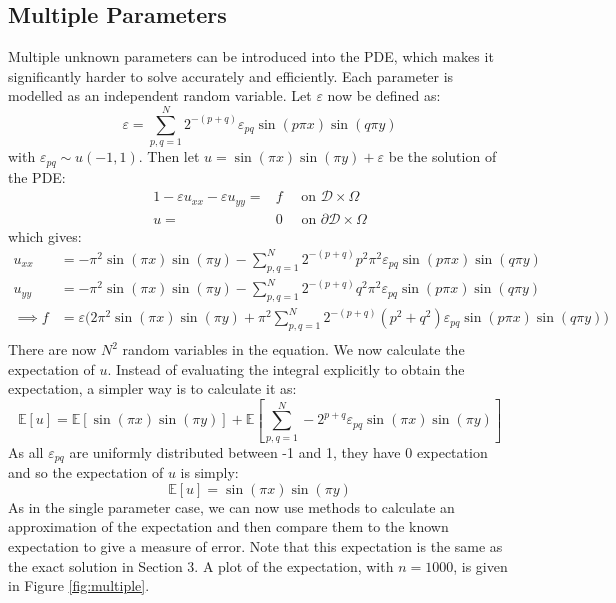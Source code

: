 \documentclass[11pt]{article}
\numberwithin{equation}{section}
\begin{document}
\subsection{Multiple Parameters}
Multiple unknown parameters can be introduced into the PDE, which makes it significantly harder to solve accurately and efficiently. Each parameter is modelled as an independent random variable. Let $\varepsilon$ now be defined as:
\begin{equation}
\varepsilon = \sum_{p,q = 1}^N 2^{-(p+q)} \varepsilon_{pq} \sin(p \pi x) \sin(q \pi y)
\end{equation}
with $\varepsilon_{pq} \sim u(-1,1)$. Then let $u = \sin(\pi x)\sin(\pi y) + \varepsilon$ be the solution of the PDE:
\begin{alignat}{1}
-\varepsilon u_{xx} -\varepsilon u_{yy} = {}& f \quad \text{ on } \mathcal{D} \times \Omega \nonumber \\
u = {}& 0 \quad \text{ on } \partial \mathcal{D} \times \Omega
\end{alignat}
which gives:
\begin{equation}
\begin{split}
u_{xx} &= -\pi^2 \sin(\pi x)\sin(\pi y) - \sum_{p,q=1}^N 2^{-(p+q)} p^2 \pi^2 \varepsilon_{pq} \sin(p\pi x)\sin(q\pi y) \\
u_{yy} &= -\pi^2 \sin(\pi x)\sin(\pi y) - \sum_{p,q=1}^N 2^{-(p+q)} q^2 \pi^2 \varepsilon_{pq} \sin(p\pi x)\sin(q\pi y) \\
\implies f &= \varepsilon \Big(2\pi^2 \sin(\pi x) \sin(\pi y) + \pi^2 \sum_{p,q=1}^N 2^{-(p+q)} (p^2 + q^2) \varepsilon_{pq} \sin(p \pi x)\sin(q \pi y) \Big) \\
\end{split}
\end{equation}
There are now $N^2$ random variables in the equation. We now calculate the expectation of $u$. Instead of evaluating the integral explicitly to obtain the expectation, a simpler way is to calculate it as:
\begin{equation}
\mathbb{E}[u] = \mathbb{E}[\sin(\pi x)\sin(\pi y)] + \mathbb{E}\left[\sum_{p,q=1}^N -2^{p+q} \varepsilon_{pq} \sin(\pi x)\sin(\pi y) \right]
\end{equation}
As all $\varepsilon_{pq}$ are uniformly distributed between -1 and 1, they have 0 expectation and so the expectation of $u$ is simply:
\begin{equation}
\mathbb{E}[u] = \sin(\pi x)\sin(\pi y)
\end{equation}
As in the single parameter case, we can now use methods to calculate an approximation of the expectation and then compare them to the known expectation to give a measure of error. Note that this expectation is the same as the exact solution in Section 3. A plot of the expectation, with $n=1000$, is given in Figure \ref{fig:multiple}.
\end{document}
